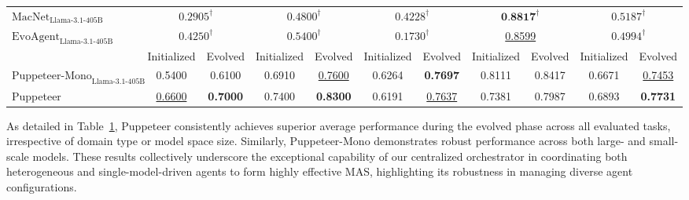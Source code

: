 \documentclass{article}
\begin{document}
\begin{table}[ht]
{\begin{tabular}{lcccccccccc}
\(\text{MacNet}_{\text{Llama-3.1-405B}}\)& \multicolumn{2}{c}{\(\text{0.2905}^{\dagger}\)} & \multicolumn{2}{c}{\(\text{0.4800}^{\dagger}\)} & \multicolumn{2}{c}{\(\text{0.4228}^{\dagger}\)} & \multicolumn{2}{c}{\(\textbf{0.8817}^{\dagger}\)} & \multicolumn{2}{c}{\(\text{0.5187}^{\dagger}\)} \\
\rowcolor{gray!6}
\(\text{EvoAgent}_{\text{Llama-3.1-405B}}\)  & \multicolumn{2}{c}{\(\text{0.4250}^{\dagger}\)} & \multicolumn{2}{c}{\(\text{0.5400}^{\dagger}\)} & \multicolumn{2}{c}{\(\text{0.1730}^{\dagger}\)} & \multicolumn{2}{c}{\underline{0.8599}} & \multicolumn{2}{c}{\(\text{0.4994}^{\dagger}\)} \\
\cmidrule(r){2-11} 
& Initialized & Evolved & Initialized & Evolved & Initialized & Evolved & Initialized & Evolved & Initialized & Evolved \\
\cmidrule(r){2-3} \cmidrule(r){4-5} \cmidrule(r){6-7} \cmidrule(r){8-9} \cmidrule(r){10-11}
\rowcolor{gray!6}
$\text{Puppeteer-Mono}_{\text{Llama-3.1-405B}}$ & 0.5400 & 0.6100 & 0.6910 & \underline{0.7600} & 0.6264 & \textbf{0.7697} & 0.8111 & 0.8417 & 0.6671 & \underline{0.7453} \\
Puppeteer & {\underline{0.6600}} & \textbf{0.7000} & 0.7400 & \textbf{0.8300} & 0.6191 & \underline{0.7637} & 0.7381 & 0.7987 & 0.6893 & \textbf{0.7731} \\
\bottomrule

\end{tabular}
}
\label{tab:overall_performance}
\end{table}

As detailed in Table~\ref{tab:overall_performance}, Puppeteer consistently achieves superior average performance during the evolved phase across all evaluated tasks, irrespective of domain type or model space size. Similarly, Puppeteer-Mono demonstrates robust performance across both large- and small-scale models. These results collectively underscore the exceptional capability of our centralized orchestrator in coordinating both heterogeneous and single-model-driven agents to form highly effective MAS, highlighting its robustness in managing diverse agent configurations.
\end{document}
